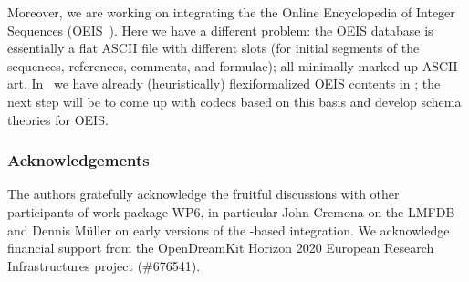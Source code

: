 Moreover, we are working on integrating the the Online Encyclopedia of Integer Sequences (OEIS~\cite{Sloane:OEIS,oeis}). 
Here we have a different problem: the OEIS database is essentially a flat ASCII file with different slots (for initial segments of the sequences, references, comments, and formulae); all minimally marked up ASCII art. 
In~\cite{LuzKoh:fsarfo16} we have already (heuristically) flexiformalized OEIS contents in \ommt; the next step will be to come up with codecs based on this basis and develop schema theories for OEIS.

\subsubsection*{Acknowledgements}
The authors gratefully acknowledge the fruitful discussions with other participants of
work package WP6, in particular John Cremona on the LMFDB and Dennis M\"uller on early
versions of the \ommt-based integration. We acknowledge financial support from the
OpenDreamKit Horizon 2020 European Research Infrastructures project (\#676541).


